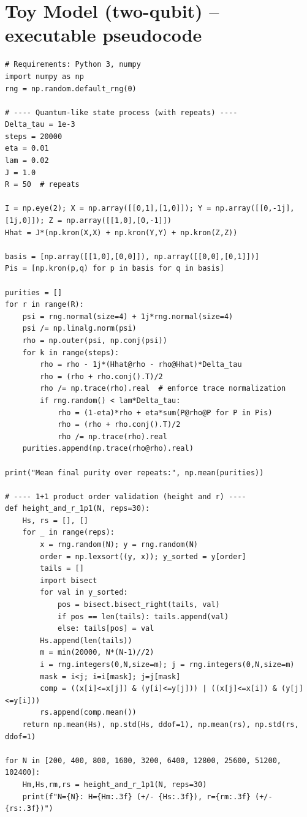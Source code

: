 \documentclass[12pt,a4paper]{article}
\begin{document}
\section{Toy Model (two-qubit) -- executable pseudocode}\label{app:toy}
\begin{verbatim}
# Requirements: Python 3, numpy
import numpy as np
rng = np.random.default_rng(0)

# ---- Quantum-like state process (with repeats) ----
Delta_tau = 1e-3
steps = 20000
eta = 0.01
lam = 0.02
J = 1.0
R = 50  # repeats

I = np.eye(2); X = np.array([[0,1],[1,0]]); Y = np.array([[0,-1j],[1j,0]]); Z = np.array([[1,0],[0,-1]])
Hhat = J*(np.kron(X,X) + np.kron(Y,Y) + np.kron(Z,Z))

basis = [np.array([[1,0],[0,0]]), np.array([[0,0],[0,1]])]
Pis = [np.kron(p,q) for p in basis for q in basis]

purities = []
for r in range(R):
    psi = rng.normal(size=4) + 1j*rng.normal(size=4)
    psi /= np.linalg.norm(psi)
    rho = np.outer(psi, np.conj(psi))
    for k in range(steps):
        rho = rho - 1j*(Hhat@rho - rho@Hhat)*Delta_tau
        rho = (rho + rho.conj().T)/2
        rho /= np.trace(rho).real  # enforce trace normalization
        if rng.random() < lam*Delta_tau:
            rho = (1-eta)*rho + eta*sum(P@rho@P for P in Pis)
            rho = (rho + rho.conj().T)/2
            rho /= np.trace(rho).real
    purities.append(np.trace(rho@rho).real)

print("Mean final purity over repeats:", np.mean(purities))

# ---- 1+1 product order validation (height and r) ----
def height_and_r_1p1(N, reps=30):
    Hs, rs = [], []
    for _ in range(reps):
        x = rng.random(N); y = rng.random(N)
        order = np.lexsort((y, x)); y_sorted = y[order]
        tails = []
        import bisect
        for val in y_sorted:
            pos = bisect.bisect_right(tails, val)
            if pos == len(tails): tails.append(val)
            else: tails[pos] = val
        Hs.append(len(tails))
        m = min(20000, N*(N-1)//2)
        i = rng.integers(0,N,size=m); j = rng.integers(0,N,size=m)
        mask = i<j; i=i[mask]; j=j[mask]
        comp = ((x[i]<=x[j]) & (y[i]<=y[j])) | ((x[j]<=x[i]) & (y[j]<=y[i]))
        rs.append(comp.mean())
    return np.mean(Hs), np.std(Hs, ddof=1), np.mean(rs), np.std(rs, ddof=1)

for N in [200, 400, 800, 1600, 3200, 6400, 12800, 25600, 51200, 102400]:
    Hm,Hs,rm,rs = height_and_r_1p1(N, reps=30)
    print(f"N={N}: H={Hm:.3f} (+/- {Hs:.3f}), r={rm:.3f} (+/- {rs:.3f})")
\end{verbatim}
\end{document}

